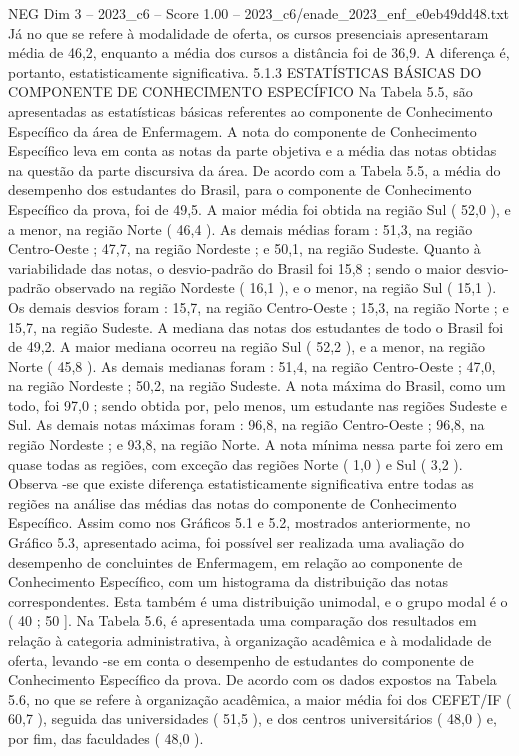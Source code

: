 \begin{textsample}{NEG Dim 3 – 2023\_c6 – Score 1.00 – 2023\_c6/enade\_2023\_enf\_e0eb49dd48.txt}
Já no que se refere à modalidade de oferta, os cursos presenciais apresentaram média de 46,2, enquanto a média dos cursos a distância foi de 36,9.
A diferença é, portanto, estatisticamente significativa. 5.1.3 ESTATÍSTICAS BÁSICAS DO COMPONENTE DE CONHECIMENTO ESPECÍFICO Na Tabela 5.5, são apresentadas as estatísticas básicas referentes ao componente de Conhecimento Específico da área de Enfermagem.
A nota do componente de Conhecimento Específico leva em conta as notas da parte objetiva e a média das notas obtidas na questão da parte discursiva da área.
De acordo com a Tabela 5.5, a média do desempenho dos estudantes do Brasil, para o componente de Conhecimento Específico da prova, foi de 49,5.
A maior média foi obtida na região Sul ( 52,0 ), e a menor, na região Norte ( 46,4 ).
As demais médias foram : 51,3, na região Centro-Oeste ; 47,7, na região Nordeste ; e 50,1, na região Sudeste.
Quanto à variabilidade das notas, o desvio-padrão do Brasil foi 15,8 ; sendo o maior desvio-padrão observado na região Nordeste ( 16,1 ), e o menor, na região Sul ( 15,1 ).
Os demais desvios foram : 15,7, na região Centro-Oeste ; 15,3, na região Norte ; e 15,7, na região Sudeste.
A mediana das notas dos estudantes de todo o Brasil foi de 49,2.
A maior mediana ocorreu na região Sul ( 52,2 ), e a menor, na região Norte ( 45,8 ).
As demais medianas foram : 51,4, na região Centro-Oeste ; 47,0, na região Nordeste ; 50,2, na região Sudeste.
A nota máxima do Brasil, como um todo, foi 97,0 ; sendo obtida por, pelo menos, um estudante nas regiões Sudeste e Sul.
As demais notas máximas foram : 96,8, na região Centro-Oeste ; 96,8, na região Nordeste ; e 93,8, na região Norte.
A nota mínima nessa parte foi zero em quase todas as regiões, com exceção das regiões Norte ( 1,0 ) e Sul ( 3,2 ).
Observa -se que existe diferença estatisticamente significativa entre todas as regiões na análise das médias das notas do componente de Conhecimento Específico.
Assim como nos Gráficos 5.1 e 5.2, mostrados anteriormente, no Gráfico 5.3, apresentado acima, foi possível ser realizada uma avaliação do desempenho de concluintes de Enfermagem, em relação ao componente de Conhecimento Específico, com um histograma da distribuição das notas correspondentes.
Esta também é uma distribuição unimodal, e o grupo modal é o ( 40 ; 50 ].
Na Tabela 5.6, é apresentada uma comparação dos resultados em relação à categoria administrativa, à organização acadêmica e à modalidade de oferta, levando -se em conta o desempenho de estudantes do componente de Conhecimento Específico da prova.
De acordo com os dados expostos na Tabela 5.6, no que se refere à organização acadêmica, a maior média foi dos CEFET/IF ( 60,7 ), seguida das universidades ( 51,5 ), e dos centros universitários ( 48,0 ) e, por fim, das faculdades ( 48,0 ).

\end{textsample}
